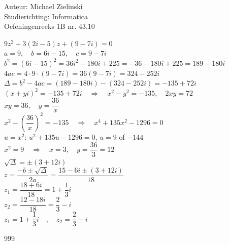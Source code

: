 \documentclass[a4paper]{article}
\begin{document}
\noindent \large Auteur: Michael Zielinski \\
\noindent \large Studierichting: Informatica \\
\noindent \large Oefeningenreeks 1B nr. 43.10 \\

\medskip
\normalsize

\thispagestyle{empty}

$9z^2 + 3(2i - 5)z + (9 - 7i) = 0$ \\
  
$a = 9,\quad b = 6i - 15,\quad c = 9 - 7i$ \\
  
$b^2 = (6i - 15)^2 = 36i^2 - 180i + 225 = -36 - 180i + 225 = 189 - 180i$ \\
  
$4ac = 4 \cdot 9 \cdot (9 - 7i) = 36(9 - 7i) = 324 - 252i$ \\
  
$\Delta = b^2 - 4ac = (189 - 180i) - (324 - 252i) = -135 + 72i$ \\
  
$(x + yi)^2 = -135 + 72i \quad\Rightarrow\quad x^2 - y^2 = -135,\quad 2xy = 72$ \\
  
$xy = 36,\quad y = \dfrac{36}{x}$ \\
  
$x^2 - \left(\dfrac{36}{x}\right)^2 = -135 \quad\Rightarrow\quad x^4 + 135x^2 - 1296 = 0$ \\
  
$u = x^2$: $u^2 + 135u - 1296 = 0$, $u = 9$ of $-144$ \\  
  
$x^2 = 9 \quad\Rightarrow\quad x = 3,\quad y = \dfrac{36}{3} = 12$ \\
  
$\sqrt{\Delta} = \pm (3 + 12i)$ \\
  
$z = \dfrac{-b \pm \sqrt{\Delta}}{2a} = \dfrac{15 - 6i \pm (3 + 12i)}{18}$ \\
  
$z_1 = \dfrac{18 + 6i}{18} = 1 + \dfrac{1}{3}i$ \\
  
$z_2 = \dfrac{12 - 18i}{18} = \dfrac{2}{3} - i$ \\
  
$\boxed{z_1 = 1 + \dfrac{1}{3}i \quad,\quad z_2 = \dfrac{2}{3} - i}$ \\  

\begin{thebibliography}{999}
\end{thebibliography}
\end{document}
